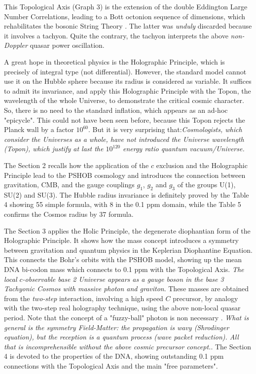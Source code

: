 \documentclass[a4paper,9pt]{article}
\begin{document}
This Topological Axis (Graph 3) is the extension of the double Eddington Large Number Correlations, leading to a Bott octonion sequence of dimensions,  which rehabilitates the bosonic String Theory \cite{Sanchez2}. The latter was \textit {unduly} discarded because it involves a tachyon. Quite the contrary, the tachyon interprets the above \textit{non-Doppler} quasar power oscillation.

A great hope in theoretical physics is the Holographic Principle, which is precisely of integral type (not differential). However, the standard model cannot use it on the Hubble sphere because its radius is considered as variable. It suffices to admit its invariance, and apply this Holographic Principle with the Topon, the wavelength of the whole Universe, to demonstrate the critical cosmic character. So, there is no need to the standard inflation, which appears as an ad-hoc "epicycle". This could not have been seen before, because this Topon rejects the Planck wall by a factor $10^{60}$. But it is very surprising that:\textit {Cosmologists, which consider the Universes as a whole, have not introduced the Universe wavelength (Topon), which justify at last the $10^{120}$ energy ratio quantum vacuum/Universe. \cite{Sanchez2} }

The Section 2 recalls how the application of the $c$ exclusion and the Holographic Principle lead to the PSHOB cosmology and introduces the connection between gravitation, CMB, and the gauge couplings $g_1$, $g_2$ and $g_3$ of the groups U(1), SU(2) and SU(3). The Hubble radius invariance is definitely proved by the Table 4 showing 55 simple formula, with 8 in the 0.1 ppm domain, while the Table 5 confirms the Cosmos radius by 37 formula.

The Section 3 applies the Holic Principle, the degenerate diophantian form of the Holographic Principle. It shows how the mass concept introduces a symmetry between gravitation and quantum physics in the Keplerian Diophantine Equation. This connects the Bohr’s orbits with the PSHOB model, showing up the mean DNA bi-codon mass which connects to 0.1 ppm with the Topological Axis. \textit{The local $c$-observable base 2 Universe appears as a gauge boson in the base 3 Tachyonic Cosmos with massive photon and graviton}. These masses are obtained from the \textit{two-step} interaction, involving a high speed $C$ precursor, by analogy with the two-step real holography technique, using the above non-local quasar period. Note that the concept of a "fuzzy-ball" photon is non necessary \cite{Scully}. \textit {What is general is the symmetry Field-Matter: the propagation is wavy (Shrodinger equation), but the reception is a quantum process (wave packet reduction). All that is incomprehensible without the above cosmic precursor concept.}. The Section 4 is devoted to the properties of the DNA, showing outstanding 0.1 ppm connections with the Topological Axis and the main "free parameters". 
\end{document}
